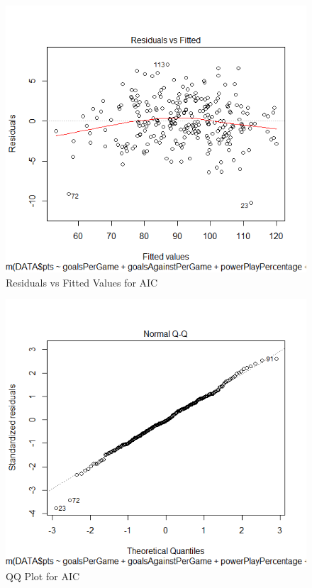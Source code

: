 \documentclass{beamer}
\begin{document}
\begin{frame}
\begin{itemize}
	\begin{figure}
		\centering
		\includegraphics[width=0.7\linewidth]{AIC1}
		\caption{Residuals vs Fitted Values for AIC}
		\label{fig:Residuals vs Fitted Values for AIC}
	\end{figure}
\end{itemize}
\end{frame}
\begin{frame}
	\begin{figure}
		\centering
		\includegraphics[width=0.7\linewidth]{AIC2}
		\caption{QQ Plot for AIC}
		\label{fig:QQ Plot for AIC}
	\end{figure}
\end{frame}
\end{document}
